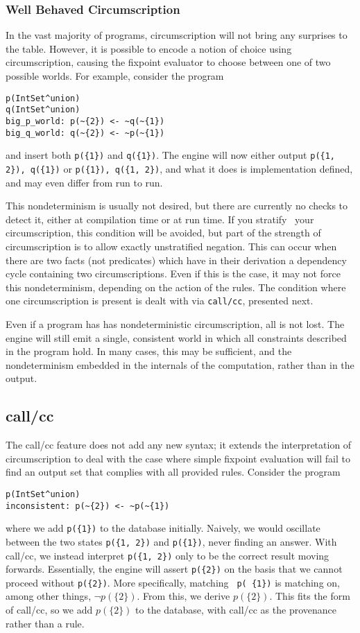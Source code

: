 \subsubsection{Well Behaved Circumscription}
In the vast majority of programs, circumscription will not bring any surprises to the table.
However, it is possible to encode a notion of choice using circumscription, causing the fixpoint evaluator to choose between one of two possible worlds.
For example, consider the program
\begin{verbatim}
p(IntSet^union)
q(IntSet^union)
big_p_world: p(~{2}) <- ~q(~{1})
big_q_world: q(~{2}) <- ~p(~{1})
\end{verbatim}
and insert both \texttt{p(\{1\})} and \texttt{q(\{1\})}.
The engine will now either output \texttt{p(\{1, 2\}), q(\{1\})} or \texttt{p(\{1\}), q(\{1, 2\})}, and what it does is implementation defined, and may even differ from run to run.

This nondeterminism is usually not desired, but there are currently no checks to detect it, either at compilation time or at run time.
If you stratify~\cite{prologbook} your circumscription, this condition will be avoided, but part of the strength of circumscription is to allow exactly unstratified negation.
This can occur when there are two facts (not predicates) which have in their derivation a dependency cycle containing two circumscriptions.
Even if this is the case, it may not force this nondeterminism, depending on the action of the rules.
The condition where one circumscription is present is dealt with via \texttt{call/cc}, presented next.

Even if a program has has nondeterministic circumscription, all is not lost.
The engine will still emit a single, consistent world in which all constraints described in the program hold.
In many cases, this may be sufficient, and the nondeterminism embedded in the internals of the computation, rather than in the output.

\subsection{call/cc}
\label{holmes:sec:callcc}
The call/cc feature does not add any new syntax; it extends the interpretation of circumscription to deal with the case where simple fixpoint evaluation will fail to find an output set that complies with all provided rules.
Consider the program
\begin{verbatim}
p(IntSet^union)
inconsistent: p(~{2}) <- ~p(~{1})
\end{verbatim}
where we add \texttt{p(\{1\})} to the database initially.
Naively, we would oscillate between the two states \texttt{p(\{1, 2\})} and \texttt{p(\{1\})}, never finding an answer.
With call/cc, we instead interpret \texttt{p(\{1, 2\})} only to be the correct result moving forwards.
Essentially, the engine will assert \texttt{p(\{2\})} on the basis that we cannot proceed without \texttt{p(\{2\})}.
More specifically, matching \texttt{~p(~\{1\})} is matching on, among other things, $\neg p(\{2\})$.
From this, we derive $p(\{2\})$.
This fits the form of call/cc, so we add $p(\{2\})$ to the database, with call/cc as the provenance rather than a rule.


